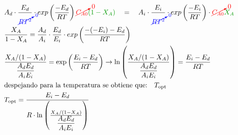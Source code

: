 {\begin{align*}
         & A_d \cdot \frac{E_d}{\textcolor{blue}{\cancelto{0}{RT^2}}} \cdot exp\left({\frac{-E_d}{RT}}\right) \textcolor{red}{\cancelto{0}{C_{A0}}}\textcolor{darkgreen}{(1-X_A)}\hspace{1em} =  \hspace{1em} A_i \cdot \frac{E_i}{\textcolor{blue}{\cancelto{{0}}{RT^2}}} \cdot exp\left({\frac{-E_i}{RT}}\right)\cdot \textcolor{red}{\cancelto{0}{C_{A0}}}\textcolor{darkgreen}{X_A} \\
         & \frac{X_A}{1-X_A} = \frac{A_d}{A_i} \cdot \frac{E_d}{E_i} \cdot exp\left({\frac{-(-E_i)-E_d}{RT}}\right)                                                                                                                                                                                                                                                                     \\
         & \frac{{X_A/(1 - X_A)}}{\dfrac{A_d E_d}{A_i E_i}} = \exp\left(\frac{E_i - E_d}{RT}\right) \rightarrow \ln\left(\frac{{X_A/(1 - X_A)}}{\dfrac{A_d E_d}{A_i E_i}}\right) = \frac{E_i - E_d}{RT}                                                                                                                                                                                 \\
         & \text{despejando para la temperatura se obtiene que:}\hspace{1em}T_{\text{opt}}                                                                                                                                                                                                                                                                                              \\
         & T_{\text{opt}} = \frac{E_i-E_d}{R \cdot \ln\left(\frac{{X_A/(1 - X_A)}}{\dfrac{A_d E_d}{A_i E_i}}\right)}
    \end{align*}
}

